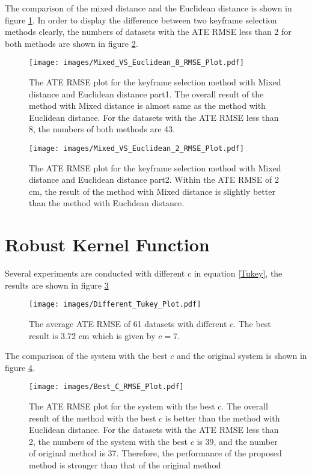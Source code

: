The comparison of the mixed distance and the Euclidean distance is shown in figure \ref{Mixed_VS_Euclidean_8_RMSE_Plot}. In order to display the difference between two keyframe selection methods clearly, the numbers of datasets with the ATE RMSE less than 2 for both methods are shown in figure \ref{Mixed_VS_Euclidean_2_RMSE_Plot}.
\begin{figure}[thb]
    \centering
    \texttt{[image: images/Mixed\_VS\_Euclidean\_8\_RMSE\_Plot.pdf]}
    \caption[The ATE RMSE plot for the keyframe selection method with Mixed distance and Euclidean distance part1]{The ATE RMSE plot for the keyframe selection method with Mixed distance and Euclidean distance part1. The overall result of the method with Mixed distance is almost same as the method with Euclidean distance. For the datasets with the ATE RMSE less than 8, the numbers of both methods are 43.}\label{Mixed_VS_Euclidean_8_RMSE_Plot}
\end{figure}

\begin{figure}[thb]
    \centering
    \texttt{[image: images/Mixed\_VS\_Euclidean\_2\_RMSE\_Plot.pdf]}
    \caption[The ATE RMSE plot for the keyframe selection method with Mixed distance and Euclidean distance part2]{The ATE RMSE plot for the keyframe selection method with Mixed distance and Euclidean distance part2. Within the ATE RMSE of 2 cm, the result of the method with Mixed distance is slightly better than the method with Euclidean distance.}\label{Mixed_VS_Euclidean_2_RMSE_Plot}
\end{figure}

\section{Robust Kernel Function}
Several experiments are conducted with different $c$ in equation \ref{Tukey}, the results are shown in figure \ref{Different_Tukey_Plot}
\begin{figure}[thb]
    \centering
    \texttt{[image: images/Different\_Tukey\_Plot.pdf]}
    \caption[The average ATE RMSE of 61 datasets with different $c$]{The average ATE RMSE of 61 datasets with different $c$. The best result is 3.72 cm which is given by $c=7$.}\label{Different_Tukey_Plot}
\end{figure}

The comparison of the system with the best $c$ and the original system is shown in figure \ref{Best_C_RMSE_Plot}.
\begin{figure}[thb]
    \centering
    \texttt{[image: images/Best\_C\_RMSE\_Plot.pdf]}
    \caption[The ATE RMSE plot for the system with the best $c$.]{The ATE RMSE plot for the system with the best $c$. The overall result of the method with the best $c$ is better than the method with Euclidean distance. For the datasets with the ATE RMSE less than 2, the numbers of the system with the best $c$ is 39, and the number of original method is 37. Therefore, the performance of the proposed method is stronger than that of the original method}\label{Best_C_RMSE_Plot}
\end{figure}

